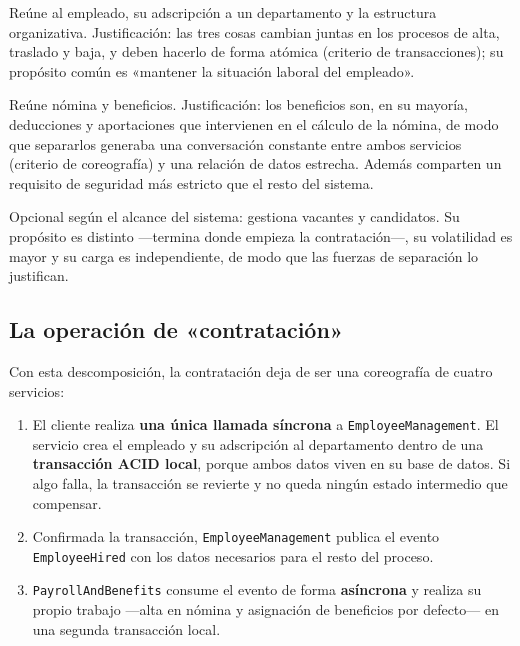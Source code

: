 \begin{description}[leftmargin=0.6cm, style=nextline]
  \item[\texttt{EmployeeManagement}] Reúne al empleado, su adscripción a un departamento y la estructura organizativa. Justificación: las tres cosas cambian juntas en los procesos de alta, traslado y baja, y deben hacerlo de forma atómica (criterio de transacciones); su propósito común es «mantener la situación laboral del empleado».
  \item[\texttt{PayrollAndBenefits}] Reúne nómina y beneficios. Justificación: los beneficios son, en su mayoría, deducciones y aportaciones que intervienen en el cálculo de la nómina, de modo que separarlos generaba una conversación constante entre ambos servicios (criterio de coreografía) y una relación de datos estrecha. Además comparten un requisito de seguridad más estricto que el resto del sistema.
  \item[\texttt{Recruiting}] Opcional según el alcance del sistema: gestiona vacantes y candidatos. Su propósito es distinto ---termina donde empieza la contratación---, su volatilidad es mayor y su carga es independiente, de modo que las fuerzas de separación lo justifican.
\end{description}

\subsection{La operación de «contratación»}

Con esta descomposición, la contratación deja de ser una coreografía de cuatro servicios:

\begin{enumerate}[leftmargin=1.8em]
  \item El cliente realiza \textbf{una única llamada síncrona} a \texttt{EmployeeManagement}. El servicio crea el empleado y su adscripción al departamento dentro de una \textbf{transacción ACID local}, porque ambos datos viven en su base de datos. Si algo falla, la transacción se revierte y no queda ningún estado intermedio que compensar.
  \item Confirmada la transacción, \texttt{EmployeeManagement} publica el evento \texttt{EmployeeHired} con los datos necesarios para el resto del proceso.
  \item \texttt{PayrollAndBenefits} consume el evento de forma \textbf{asíncrona} y realiza su propio trabajo ---alta en nómina y asignación de beneficios por defecto--- en una segunda transacción local.
\end{enumerate}

